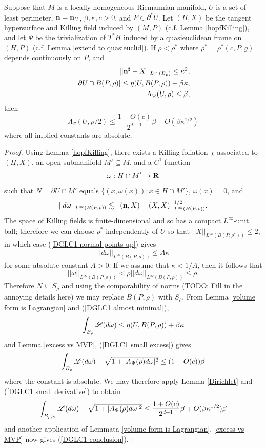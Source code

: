 \begin{lemma}\label{DGLC1}
Suppose that $M$ is a locally homogeneous Riemannian manifold, $U$ is a set of least perimeter, $\mathbf n = \mathbf n_U$, $\beta, \kappa, c > 0$, and $P \in \partial^* U$.
Let $(H, X)$ be the tangent hypersurface and Killing field induced by $(M, P)$ (c.f. Lemma \ref{hopfKilling}), and let $\Psi$ be the trivialization of $T^* H$ induced by a quasieuclidean frame on $(H, P)$ (c.f. Lemma \ref{extend to quasieuclid}).
If $\rho < \rho^*$ where $\rho^* = \rho^*(c, P, g)$ depends continuously on $P$, and
\begin{align}
||\mathbf n^\sharp - X||_{L^\infty(B_\rho)} \leq \kappa^2, \label{DGLC1 normal points up} \\
|\partial U \cap B(P, \rho)| \leq \eta(U, B(P, \rho)) + \beta \kappa, \label{DGLC1 almost minimal} \\
\Lambda_\Psi(U, \rho) \leq \beta, \label{DGLC1 small excess}
\end{align}
then 
\begin{equation}
\Lambda_\Psi(U, \rho/2) \leq \frac{1 + O(c)}{2^{d + 1}} \beta + O(\beta \kappa^{1/2}) \label{DGLC1 conclusion}
\end{equation}
where all implied constants are absolute.
\end{lemma}
\begin{proof}
Using Lemma \ref{hopfKilling}, there exists a Killing foliation $\chi$ associated to $(H, X)$, an open submanifold $M' \subseteq M$, and a $C^1$ function
$$\omega: H \cap M' \to \mathbf{R}$$
such that $N = \partial U \cap M'$ equals $\{(x, \omega(x)): x \in H \cap M'\}$, $\omega(x) = 0$, and 
$$||d\omega||_{L^\infty(B(P, \rho))} \lesssim ||(\mathbf n, X) - (X, X)||_{L^\infty(B(P, \rho))}^{1/2}.$$
The space of Killing fields is finite-dimensional and so has a compact $L^\infty$-unit ball; therefore we can choose $\rho^*$ independently of $U$ so that $||X||_{L^\infty(B(P, \rho^*))} \leq 2$, in which case (\ref{DGLC1 normal points up}) gives
\begin{equation}\label{DGLC1 small derivative}
||d\omega||_{L^\infty(B(P, \rho))} \leq A\kappa
\end{equation}
for some absolute constant $A > 0$. If we assume that $\kappa < 1/A$, then it follows that 
$$||\omega||_{L^\infty(B(P, \rho))} < \rho ||d\omega||_{L^\infty(B(P, \rho))} \leq \rho.$$
Therefore $N \subseteq S_\rho$ and using the comparability of norms (TODO: Fill in the annoying details here) we may replace $B(P, \rho)$ with $S_\rho$.
From Lemma \ref{volume form is Lagrangian} and (\ref{DGLC1 almost minimal}),
$$\int_{B_\rho} \mathscr L(d\omega) \leq \eta(U, B(P, \rho)) + \beta \kappa$$
and Lemma \ref{excess vs MVP}, (\ref{DGLC1 small excess}) gives 
$$\int_{B_\rho} \mathscr L(d\omega) - \sqrt{1 + |A_\Psi(\rho)d\omega|^2} \leq (1 + O(c)) \beta$$
where the constant is absolute.
We may therefore apply Lemma \ref{Dirichlet} and (\ref{DGLC1 small derivative}) to obtain
$$\int_{B_{\rho/2}} \mathscr L(d\omega) - \sqrt{1 + |A_\Psi(\rho)d\omega|^2} \leq \frac{1 + O(c)}{2^{d + 1}} \beta + O(\beta \kappa^{1/2}) \beta$$
and another application of Lemmata \ref{volume form is Lagrangian}, \ref{excess vs MVP} now gives (\ref{DGLC1 conclusion}).
\end{proof}


